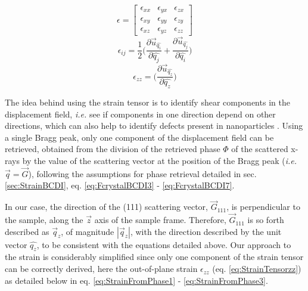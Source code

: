 \begin{multicols}{3}
    \begin{equation}
        \epsilon =
        \begin{bmatrix}
            \epsilon_{xx} & \epsilon_{yx} & \epsilon_{zx}\\
            \epsilon_{xy} & \epsilon_{yy} & \epsilon_{zy}\\
            \epsilon_{xz} & \epsilon_{yz} & \epsilon_{zz}
        \end{bmatrix}
        \label{eq:StrainTensor}
    \end{equation}
    \break
    \begin{equation}
      \epsilon_{ij} = \frac{1}{2}
        \Bigg(
        \frac{\partial \vec{u}_{\hat{q_i}}}{\partial \hat{q_j}}
        +
        \frac{\partial \vec{u}_{\hat{q_j}}}{\partial \hat{q_i}}
        \Bigg)
        \label{eq:StrainTensorIJ}
    \end{equation}
    \break
    \begin{equation}
      \epsilon_{zz} =
        \Bigg(
        \frac{\partial \vec{u}_{\hat{q_z}}}{\partial \hat{q_z}}
        \Bigg)
        \label{eq:StrainTensorzz}
    \end{equation}
\end{multicols}

The idea behind using the strain tensor is to identify shear components in the displacement field, \textit{i.e.} see if components in one direction depend on other directions, which can also help to identify defects present in nanoparticles \parencite{Lauraux2021}.
Using a single Bragg peak, only one component of the displacement field can be retrieved, obtained from the division of the retrieved phase $\Phi$ of the scattered x-rays by the value of the scattering vector at the position of the Bragg peak (\textit{i.e.} $\vec{q} = \vec{G}$), following the assumptions for phase retrieval detailed in sec. \ref{sec:StrainBCDI}, eq. \ref{eq:FcrystalBCDI3} - \ref{eq:FcrystalBCDI7}.

In our case, the direction of the (111) scattering vector, $\vec{G}_{111}$, is perpendicular to the sample, along the $\vec{z}$ axis of the sample frame.
Therefore, $\vec{G}_{111}$ is so forth described as $\vec{q}_z$, of magnitude  $|\vec{q}_z|$, with the direction described by the unit vector  $\hat{q_z}$, to be consistent with the equations detailed above.
Our approach to the strain is considerably simplified since only one component of the strain tensor can be correctly derived, here the out-of-plane strain $\epsilon_{zz}$ (eq. \ref{eq:StrainTensorzz}) as detailed below in eq. \ref{eq:StrainFromPhase1} - \ref{eq:StrainFromPhase3}.

